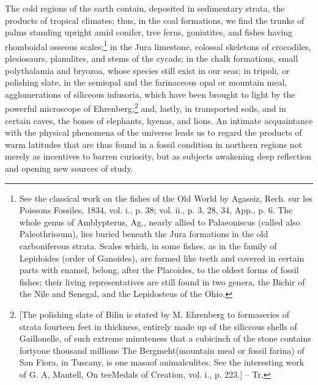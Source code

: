 The cold regions of the earth contain, deposited in sedimentary strata, the products of tropical climates; thus, in the coal formations, we find the trunks of palms standing upright amid conifer, tree ferns, goniatites, and fishes having rhomboidal osseous scales;\footnote{See the classical work on the fishes of the Old World by Agassiz, Rech. sur les Poissons Fossiles, 1834, vol. i., p. 38; vol. ii., p. 3, 28, 34, App., p. 6. The whole genus of Amblypterus, Ag., nearly allied to Palaeoniscus (called also Paleothrissum), lies buried beneath the Jura formations in the old carboniferous strata. Scales which, in some fishes, as in the family of Lepidoides (order of Ganoides), are formed like teeth and covered in certain parts with enamel, belong, after the Placoides, to the oldest forms of fossil fishes; their living representatives are still found in two genera, the Bichir of the Nile and Senegal, and the Lepidosteus of the Ohio.} in the Jura limestone, colossal skeletons of crocodiles, plesiosaurs, planulites, and stems of the cycads; in the chalk formations, small polythalamia and bryozoa, whose species still exist in our seas; in tripoli, or polishing slate, in the semiopal and the farinaceous opal or mountain meal, agglomerations of siliceous infusoria, which have been brought to light by the powerful microscope of Ehrenberg;\footnote{[The polishing slate of Bilin is stated by M. Ehrenberg to formaseries of strata fourteen feet in thickness, entirely made up of the siliccous shells of Gaillonelle, of such extreme minuteness that a cubicinch of the stone contains fortyone thousand millions The Bergmeht(mountain meal or fossil farina) of San Fiora, in Tuscany, is one masaof animalculites. See the interesting work of G. A, Mantell, On teeMedals of Creation, vol. i., p. 223.] -- Tr.} and, lastly, in transported soils, and in certain caves, the bones of elephants, hyenas, and lions. An intimate acquaintance with the physical phenomena of the universe leads us to regard the products of warm latitudes that are thus found in a fossil condition in northern regions not merely as incentives to barren curiosity, but as subjects awakening deep reflection and opening new sources of study.

